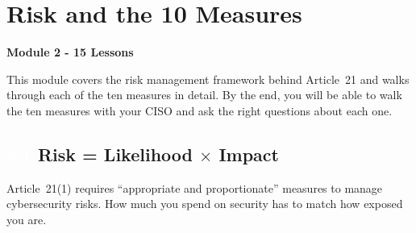 \documentclass[11pt,a4paper,twoside]{book}
\newcommand{\lessontag}[1]{%
  \texorpdfstring{%
    \setlength{\fboxsep}{3pt}\colorbox{nisd2blue}{\textcolor{white}{\footnotesize\bfseries #1}}\quad%
  }{Lesson #1\ }%
}
\begin{document}

\chapter{Risk and the 10 Measures}

\begin{moduleintro}
\textbf{Module 2 - 15 Lessons}

This module covers the risk management framework behind Article~21 and walks through each of the ten measures in detail. By the end, you will be able to walk the ten measures with your CISO and ask the right questions about each one.
\end{moduleintro}

\section{\lessontag{2.1}Risk = Likelihood $\times$ Impact}

Article~21(1) requires ``appropriate and proportionate'' measures to manage cybersecurity risks. How much you spend on security has to match how exposed you are.
\end{document}
